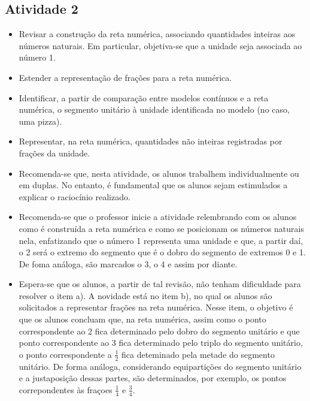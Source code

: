 \begin{multicols}{2}
\subsection{Atividade 2}

\begin{itemize} %
    \item       Revisar a construção da reta numérica, associando quantidades inteiras aos números naturais. Em particular, objetiva-se que a unidade seja associada ao número 1.
    \item       Estender a representação de frações para a reta numérica. 
    \item       Identificar, a partir de comparação entre modelos contínuos e a reta numérica, o segmento unitário à unidade identificada no modelo (no caso, uma pizza).
    \item       Representar, na reta numérica, quantidades não inteiras registradas por frações da unidade. 
\end{itemize} %
      
     
\begin{itemize} %
    \item        Recomenda-se que, nesta atividade, os alunos trabalhem individualmente ou em duplas. No entanto, é fundamental que os alunos sejam estimulados a explicar o raciocínio realizado.
    \item        Recomenda-se que o professor inicie a atividade relembrando com os alunos como é construída a reta numérica e como se posicionam os números naturais nela, enfatizando que o número 1 representa uma unidade e que, a partir daí, o 2 será o extremo do segmento que é o dobro do segmento de extremos 0 e 1. De foma análoga, são marcados o 3, o 4 e assim por diante.
    \item       Espera-se que os alunos, a partir de tal revisão, não tenham dificuldade para resolver o item a). A novidade está no item b), no qual os alunos são solicitados a representar frações na reta numérica. Nesse item, o objetivo é que os alunos concluam que, na reta numérica, assim como o ponto correspondente ao 2 fica determinado pelo dobro do segmento unitário e que ponto correspondente ao 3 fica determinado pelo triplo do segmento unitário, o ponto correspondente a       $\frac{1}{2}$       fica deteminado pela metade do segmento unitário. De forma análoga, considerando equipartições do segmento unitário e a justaposição dessas partes, são determinados, por exemplo, os pontos correpondentes às fraçoes       $\frac{1}{4}$       e       $\frac{3}{4}$.
\end{itemize} %


\end{multicols}
